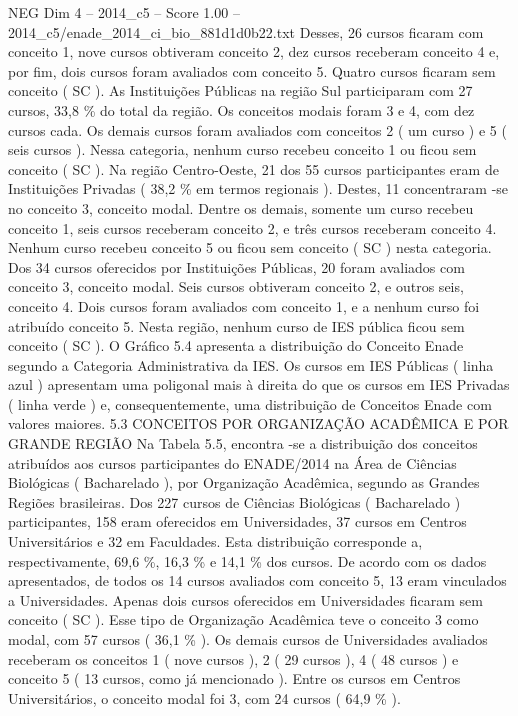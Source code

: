 \begin{textsample}{NEG Dim 4 – 2014\_c5 – Score 1.00 – 2014\_c5/enade\_2014\_ci\_bio\_881d1d0b22.txt}
Desses, 26 cursos ficaram com conceito 1, nove cursos obtiveram conceito 2, dez cursos receberam conceito 4 e, por fim, dois cursos foram avaliados com conceito 5.
Quatro cursos ficaram sem conceito ( SC ).
As Instituições Públicas na região Sul participaram com 27 cursos, 33,8 \% do total da região.
Os conceitos modais foram 3 e 4, com dez cursos cada.
Os demais cursos foram avaliados com conceitos 2 ( um curso ) e 5 ( seis cursos ).
Nessa categoria, nenhum curso recebeu conceito 1 ou ficou sem conceito ( SC ).
Na região Centro-Oeste, 21 dos 55 cursos participantes eram de Instituições Privadas ( 38,2 \% em termos regionais ).
Destes, 11 concentraram -se no conceito 3, conceito modal.
Dentre os demais, somente um curso recebeu conceito 1, seis cursos receberam conceito 2, e três cursos receberam conceito 4.
Nenhum curso recebeu conceito 5 ou ficou sem conceito ( SC ) nesta categoria.
Dos 34 cursos oferecidos por Instituições Públicas, 20 foram avaliados com conceito 3, conceito modal.
Seis cursos obtiveram conceito 2, e outros seis, conceito 4.
Dois cursos foram avaliados com conceito 1, e a nenhum curso foi atribuído conceito 5.
Nesta região, nenhum curso de IES pública ficou sem conceito ( SC ).
O Gráfico 5.4 apresenta a distribuição do Conceito Enade segundo a Categoria Administrativa da IES.
Os cursos em IES Públicas ( linha azul ) apresentam uma poligonal mais à direita do que os cursos em IES Privadas ( linha verde ) e, consequentemente, uma distribuição de Conceitos Enade com valores maiores. 5.3 CONCEITOS POR ORGANIZAÇÃO ACADÊMICA E POR GRANDE REGIÃO Na Tabela 5.5, encontra -se a distribuição dos conceitos atribuídos aos cursos participantes do ENADE/2014 na Área de Ciências Biológicas ( Bacharelado ), por Organização Acadêmica, segundo as Grandes Regiões brasileiras.
Dos 227 cursos de Ciências Biológicas ( Bacharelado ) participantes, 158 eram oferecidos em Universidades, 37 cursos em Centros Universitários e 32 em Faculdades.
Esta distribuição corresponde a, respectivamente, 69,6 \%, 16,3 \% e 14,1 \% dos cursos.
De acordo com os dados apresentados, de todos os 14 cursos avaliados com conceito 5, 13 eram vinculados a Universidades.
Apenas dois cursos oferecidos em Universidades ficaram sem conceito ( SC ).
Esse tipo de Organização Acadêmica teve o conceito 3 como modal, com 57 cursos ( 36,1 \% ).
Os demais cursos de Universidades avaliados receberam os conceitos 1 ( nove cursos ), 2 ( 29 cursos ), 4 ( 48 cursos ) e conceito 5 ( 13 cursos, como já mencionado ).
Entre os cursos em Centros Universitários, o conceito modal foi 3, com 24 cursos ( 64,9 \% ).

\end{textsample}
